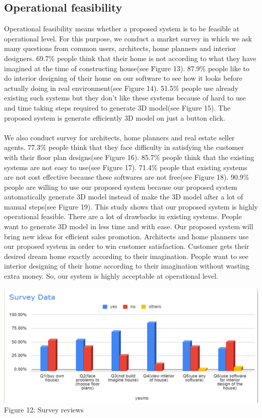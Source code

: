 \documentclass{article}
\begin{document}
\subsection{Operational feasibility}
Operational feasibility means whether a proposed system is to be feasible at operational level. For this purpose, we conduct a market survey in which we ask many questions from common users, architects, home planners and interior designers. 69.7\% people think that their home is not according to what they have imagined at the time of constructing house(see Figure 13). 87.9\% people like to do interior designing of their home on our software to see how it looks before actually doing in real environment(see Figure 14). 51.5\% people use already existing such systems but they don’t like these systems because of hard to use and time taking steps required to generate 3D model(see Figure 15). The proposed system is generate efficiently 3D model on just a button click.
\\
\\
We also conduct survey for architects, home planners and real estate seller agents. 77.3\% people think that they face difficulty in satisfying the customer with their floor plan designs(see Figure 16). 85.7\% people think that the existing systems are not easy to use(see Figure 17). 71.4\% people that existing systems are not cost effective because these softwares are not free(see Figure 18). 90.9\% people are willing to use our proposed system because our proposed system automatically generate 3D model instead of make the 3D model after a lot of manual steps(see Figure 19). 
This study shows that our proposed system is highly operational feasible. There are a lot of drawbacks in existing systems. People want to generate 3D model in less time and with ease. Our proposed system will bring new ideas for efficient sales promotion. Architects and home planners use our proposed system in order to win customer satisfaction. Customer gets their desired dream home exactly according to their imagination. People want to see interior designing of their home according to their imagination without wasting extra money. So, our system is highly acceptable at operational level.
\begin{center}
\includegraphics[scale=0.9]{surveydata}
\\Figure 12: Survey reviews
\end{center}
\end{document}

